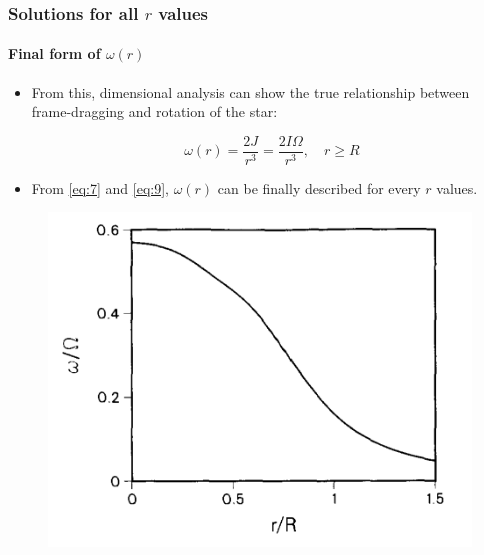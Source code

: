 \begin{frame}
\frametitle{Solutions for all $r$ values}
\framesubtitle{Final form of $\omega (r)$}

\begin{itemize}
	\item From this, dimensional analysis can show the true relationship between frame-dragging and rotation of the star:
	\begin{block}{}
		\begin{equation} \label{eq:9}
			\omega (r)
			=
			\frac{2 J}{r^{3}}
			=
			\frac{2 I \Omega}{r^{3}}, \quad r \geq R
		\end{equation}
	\end{block}
	\item From \eqref{eq:7} and \eqref{eq:9}, $\omega (r)$ can be finally described for every $r$ values.
\end{itemize}
\begin{figure}
	\centering
	\includegraphics[width=0.45\linewidth]{./images/ns-omega.png}
\end{figure}

\end{frame}
